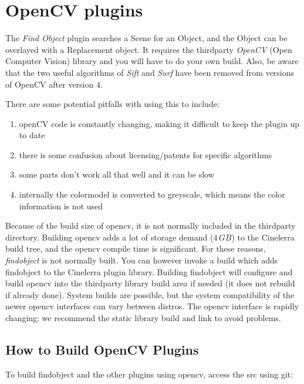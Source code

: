 {\section{OpenCV plugins}%
\label{sec:opencv_plugins}

The \textit{Find Object} plugin searches a Scene for an Object, and the Object can be overlayed with a Replacement object. It requires the thirdparty \textit{OpenCV} (Open Computer Vision) library and you will have to do your own build. Also, be aware that the two useful algorithms of \textit{Sift} and \textit{Surf} have been removed from versions of OpenCV after version $4$.

There are some potential pitfalls with using this to include:

\begin{enumerate}
    \item openCV code is constantly changing, making it difficult to keep the plugin up to date
    \item there is some confusion about licensing/patents for specific algorithms
    \item some parts don’t work all that well and it can be slow
    \item internally the colormodel is converted to greyscale, which means the color information is not used
\end{enumerate}

Because of the build size of opencv, it is not normally included in the thirdparty directory. Building opencv adds a lot of storage demand ($4\,GB$) to the Cinelerra build tree, and the opencv compile time is significant. For these reasons, \textit{findobject} is not normally built. You can however invoke a build which adds findobject to the Cinelerra plugin library. Building findobject will configure and build opencv into the thirdparty library build area if needed (it does not rebuild if already done). System builds are possible, but the system compatibility of the newer opencv interfaces can vary between distros. The opencv interface is rapidly changing; we recommend the static library build and link to avoid problems.

\subsection{How to Build OpenCV Plugins}%
\label{sub:how_build_opencv_plugins}

To build findobject and the other plugins using opencv, access the src using git:

}

